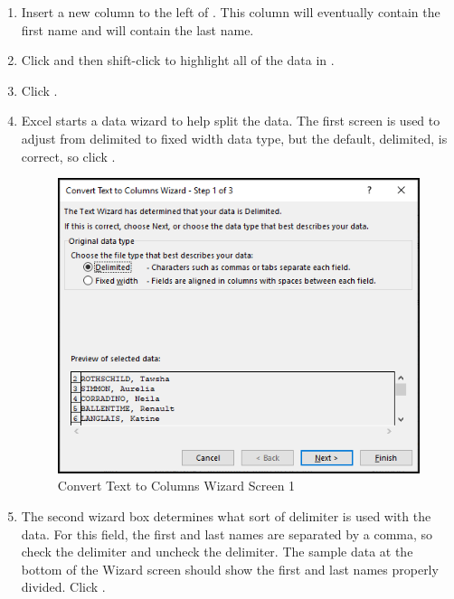 \begin{enumerate}
	\item Insert a new column to the left of . This column will eventually contain the first name and  will contain the last name.
	\item Click  and then shift-click  to highlight all of the data in .
	\item Click .
	\item Excel starts a data wizard to help split the data. The first screen is used to adjust from delimited to fixed width data type, but the default, delimited, is correct, so click .
	
	\begin{figure}[H]
		\centering
		\includegraphics[width=\maxwidth{.95\linewidth}]{gfx/ch09_fig30}
		\caption{Convert Text to Columns Wizard Screen 1}
		\label{09:fig30}
	\end{figure}

	\item The second wizard box determines what sort of delimiter is used with the data. For this field, the first and last names are separated by a comma, so check the  delimiter and uncheck the  delimiter. The sample data at the bottom of the Wizard screen should show the first and last names properly divided. Click .


\end{enumerate}
